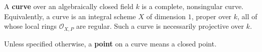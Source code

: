 A \textbf{curve} over an algebraically closed field $k$ is a complete, nonsingular curve. Equivalently, a curve is an integral scheme $X$ of dimension $1$, proper over $k$, all of whose local rings $\mathcal{O}_{X,P}$ are regular. Such a curve is necessarily projective over $k$.

Unless specified otherwise, a \textbf{point} on a curve means a closed point.
